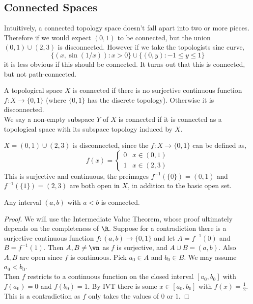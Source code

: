 
\subsection{Connected Spaces}
Intuitively, a connected topology space doesn't fall apart into two or more pieces. Therefore if we would expect $(0, 1)$ to be connected, but the union $(0, 1)\cup (2, 3)$ is disconnected. However if we take the topologists sine curve,
$$ \{(x, \sin(1/x)) : x > 0\} \cup \{(0, y) : -1 \le y \le 1\} $$
it is less obvious if this should be connected. It turns out that this is connected, but not path-connected.

\begin{ndefi}[Connected]
  A topological space $X$ is connected if there is no surjective continuous function $f : X \to \{0, 1\}$ (where $\{0, 1\}$ has the discrete topology). Otherwise it is disconnected.\\

  \noindent
  We say a non-empty subspace $Y$ of $X$ is connected if it is connected as a topological space with its subspace topology induced by $X$.
\end{ndefi}

\begin{eg}
  $X = (0, 1)\cup (2, 3)$ is disconnected, since the $f : X \to \{0, 1\}$ can be defined as,
  $$ f(x) = \begin{cases}
    0 & x \in (0, 1)\\
    1 & x \in (2, 3)
  \end{cases} $$
  This is surjective and continuous, the preimages $f^{-1}(\{0\}) = (0, 1)$ and $f^{-1}(\{1\}) = (2, 3)$ are both open in $X$, in addition to the basic open set.
\end{eg}

\begin{nthm}\label{thm:intCon}
  Any interval $(a, b)$ with $a < b$ is connected.
\end{nthm}
\begin{proof}
  We will use the Intermediate Value Theorem, whose proof ultimately depends on the completeness of $\R$. Suppose for a contradiction there is a surjective continuous function $f: (a, b) \to \{0, 1\}$ and let $A = f^{-1}(0)$ and $B = f^{-1}(1)$. Then $A, B \ne \vn$ as $f$ is surjective, and $A \cup B = (a, b)$. Also $A, B$ are open since $f$ is continuous. Pick $a_0 \in A$ and $b_0 \in B$. We may assume $a_0 < b_0$.\\

  \noindent
  Then $f$ restricts to a continuous function on the closed interval $[a_0, b_0]$ with $f(a_0) = 0$ and $f(b_0) = 1$. By IVT there is some $x \in [a_0, b_0]$ with $f(x) = \frac{1}{2}$. This is a contradiction as $f$ only takes the values of $0$ or $1$.
\end{proof}

